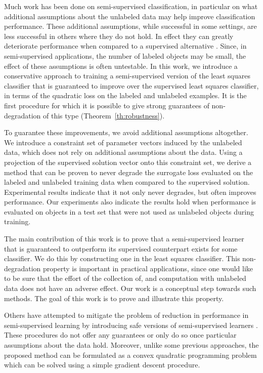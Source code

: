 \documentclass[smallcondensed]{svjour3}\usepackage[]{graphicx}\usepackage[]{color}
\begin{document}
Much work has been done on semi-supervised classification, in particular on what additional assumptions about the unlabeled data may help improve classification performance. These additional assumptions, while successful in some settings, are less successful in others where they do not hold. In effect they can greatly deteriorate performance when compared to a supervised alternative \citep{Cozman2006}. Since, in semi-supervised applications, the number of labeled objects may be small, the effect of these assumptions is often untestable. In this work, we introduce a conservative approach to training a semi-supervised version of the least squares classifier that is guaranteed to improve over the supervised least squares classifier, in terms of the quadratic loss on the labeled and unlabeled examples. It is the first procedure for which it is possible to give strong guarantees of non-degradation of this type (Theorem~\ref{th:robustness}).

To guarantee these improvements, we avoid additional assumptions altogether. We introduce a constraint set of parameter vectors induced by the unlabeled data, which does not rely on additional assumptions about the data. Using a projection of the supervised solution vector onto this constraint set, we derive a method that can be proven to never degrade the surrogate loss evaluated on the labeled and unlabeled training data when compared to the supervised solution. Experimental results indicate that it not only never degrades, but often improves performance. Our experiments also indicate the results hold when performance is evaluated on objects in a test set that were not used as unlabeled objects during training.

The main contribution of this work is to prove that a semi-supervised learner that is guaranteed to outperform its supervised counterpart exists for some classifier. We do this by constructing one in the least squares classifier. This non-degradation property is important in practical applications, since one would like to be sure that the effort of the collection of, and computation with unlabeled data does not have an adverse effect. Our work is a conceptual step towards such methods. The goal of this work is to prove and illustrate this property.

Others have attempted to mitigate the problem of reduction in performance in semi-supervised learning by introducing safe versions of semi-supervised learners \citep{Li2011,Loog2010,Loog2014a}. These procedures do not offer any guarantees or only do so once particular assumptions about the data hold. Moreover, unlike some previous approaches, the proposed method can be formulated as a convex quadratic programming problem which can be solved using a simple gradient descent procedure.
\end{document}
